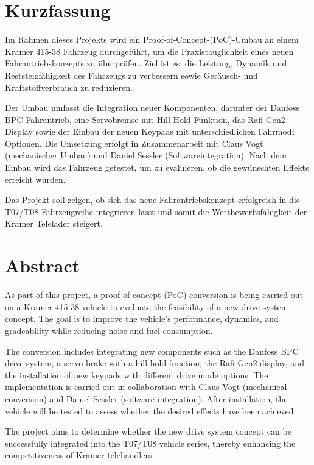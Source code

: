 \documentclass[a4paper, 12pt]{article} %
\begin{document}
\rmfamily

\clearpage

\section*{Kurzfassung}
\begin{spacing}{1.8}  %
    \fontsize{14pt}{14pt}\selectfont  %
    Im Rahmen dieses Projekts wird ein Proof-of-Concept-(PoC)-Umbau an einem Kramer 415-38 Fahrzeug durchgeführt, 
    um die Praxistauglichkeit eines neuen Fahrantriebskonzepts zu überprüfen. Ziel ist es, die Leistung, 
    Dynamik und Reststeigfähigkeit des Fahrzeugs zu verbessern sowie Geräusch- und Kraftstoffverbrauch zu reduzieren.

    Der Umbau umfasst die Integration neuer Komponenten, darunter der Danfoss BPC-Fahrantrieb, 
    eine Servobremse mit Hill-Hold-Funktion, das Rafi Gen2 Display sowie der Einbau der neuen Keypads 
    mit unterschiedlichen Fahrmodi Optionen. Die Umsetzung erfolgt in Zusammenarbeit mit Claus Vogt (mechanischer Umbau) und 
    Daniel Sessler (Softwareintegration). Nach dem Einbau wird das Fahrzeug getestet, um zu evaluieren, ob die gewünschten Effekte erreicht wurden.
    
    Das Projekt soll zeigen, ob sich das neue Fahrantriebskonzept erfolgreich in die T07/T08-Fahrzeugreihe integrieren lässt und somit die Wettbewerbsfähigkeit der Kramer Telelader steigert.
\end{spacing}

\clearpage
\section*{Abstract}
\begin{spacing}{1.8}  %
    \fontsize{14pt}{14pt}\selectfont  %
    As part of this project, a proof-of-concept (PoC) conversion is being carried out on a Kramer 415-38 
    vehicle to evaluate the feasibility of a new drive system concept. The goal is to 
    improve the vehicle's performance, dynamics, and gradeability while reducing noise and fuel consumption.

    The conversion includes integrating new components such as the Danfoss BPC drive system, 
    a servo brake with a hill-hold function, the Rafi Gen2 display, and the installation of new 
    keypads with different drive mode options. The implementation is carried out in collaboration with Claus Vogt 
    (mechanical conversion) and Daniel Sessler (software integration). After installation, the vehicle 
    will be tested to assess whether the desired effects have been achieved.
    
    The project aims to determine whether the new drive system concept can be successfully 
    integrated into the T07/T08 vehicle series, thereby enhancing the competitiveness of Kramer telehandlers.

\end{spacing}
\clearpage
\end{document}
